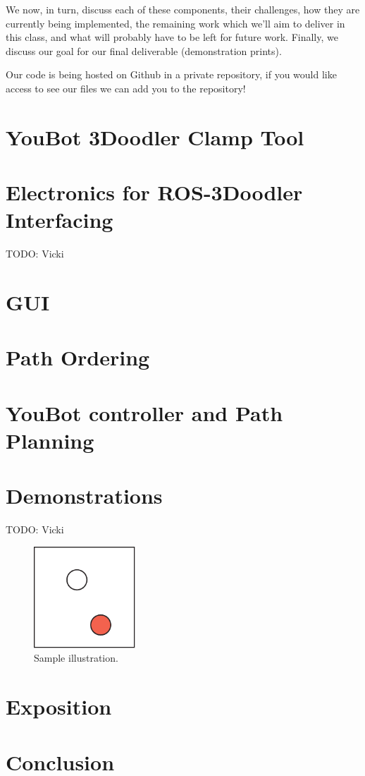 \documentclass[conference]{acmsiggraph}
\begin{document}
We now, in turn, discuss each of these components, their challenges, how they are currently being implemented, the remaining work which we'll aim to deliver in this class, and what will probably have to be left for future work.  Finally, we discuss our goal for our final deliverable (demonstration prints).

Our code is being hosted on Github in a private repository, if you would like access to see our files we can add you to the repository!



\section{YouBot 3Doodler Clamp Tool}


\section{Electronics for ROS-3Doodler Interfacing}
TODO: Vicki

\section{GUI}

\section{Path Ordering}

\section{YouBot controller and Path Planning}

\section{Demonstrations}
TODO: Vicki



\begin{figure}[ht]
  \centering
  \includegraphics[width=1.5in]{images/samplefigure}
  \caption{Sample illustration.}
\end{figure}


\section{Exposition}



\section{Conclusion}






\end{document}
